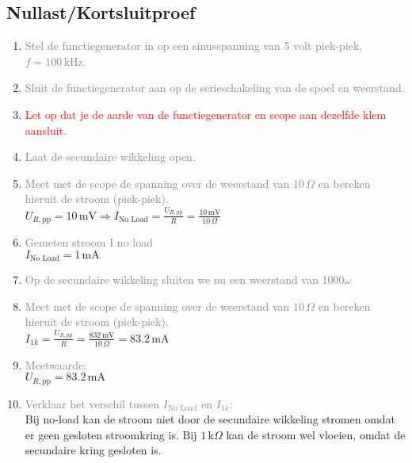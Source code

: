 \subsection{Nullast/Kortsluitproef}
\begin{enumerate}
    \item \textcolor{gray}{Stel de functiegenerator in op een sinusspanning van 5 volt piek-piek, \( f = 100 \, \text{kHz} \).}
    \item \textcolor{gray}{Sluit de functiegenerator aan op de serieschakeling van de spoel en weerstand.}
    \item \textcolor{red}{Let op dat je de aarde van de functiegenerator en scope aan dezelfde klem aansluit.}
    \item \textcolor{gray}{Laat de secundaire wikkeling open.}
    \item \textcolor{gray}{Meet met de scope de spanning over de weerstand van \(10 \, \Omega\) en bereken hieruit de stroom (piek-piek).}
    \\ \( U_{R,\text{pp}} = 10 \, \text{mV} \Rightarrow I_{\text{No Load}} = \frac{U_{R,\text{pp}}}{R} = \frac{10 \, \text{mV}}{10 \, \Omega}\)
    
    \item \textcolor{gray}{Gemeten stroom I no load}
    \\ \(I_{\text{No Load}}= 1 \, \text{mA}\) 
    
    \item \textcolor{gray}{Op de secundaire wikkeling sluiten we nu een weerstand van 1000\(\omega\)}
    \item \textcolor{gray}{Meet met de scope de spanning over de weerstand van \(10 \, \Omega\) en bereken hieruit de stroom (piek-piek).}
    \\ \(I_{1k} = \frac{U_{R,\text{pp}}}{R} = \frac{832 \, \text{mV}}{10 \, \Omega} = 83.2 \, \text{mA}\)
    
    \item \textcolor{gray}{Meetwaarde:}
    \\ \( U_{R,\text{pp}} = 83.2 \, \text{mA} \)
    
    \item \textcolor{gray}{Verklaar het verschil tussen \( I_{\text{No Load}} \) en \( I_{1k} \): }
    \\ Bij no-load kan de stroom niet door de secundaire wikkeling stromen omdat er geen gesloten stroomkring is. Bij \(1 \, \text{k} \Omega\) kan de stroom wel vloeien, omdat de secundaire kring gesloten is.


\end{enumerate}
